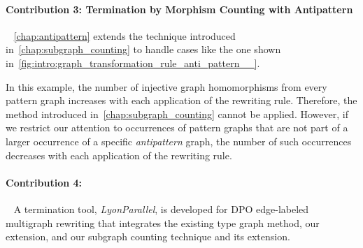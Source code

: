 \paragraph{Contribution 3: Termination by Morphism Counting with Antipattern}
\ \newline
\autoref{chap:antipattern} extends the technique introduced in~\autoref{chap:subgraph_counting} to handle cases like the one shown in~\autoref{fig:intro:graph_transformation_rule_anti_pattern__}.
 \begin{figure}[!ht]
    \centering
{}
  \caption{}
  \label{fig:intro:graph_transformation_rule_anti_pattern__}
 \end{figure} 
In this example, the number of injective graph homomorphisms from every pattern graph increases with each application of the rewriting rule. Therefore, the method introduced in~\autoref{chap:subgraph_counting} cannot be applied. However, if we restrict our attention to occurrences of pattern graphs that are not part of a larger occurrence of a specific \emph{antipattern} graph, the number of such occurrences decreases with each application of the rewriting rule. 

\paragraph{Contribution 4:}
\ \newline
A termination tool, \textit{LyonParallel}, is developed for DPO edge-labeled multigraph rewriting that integrates the existing type graph method, our extension, and our subgraph counting technique and its extension.